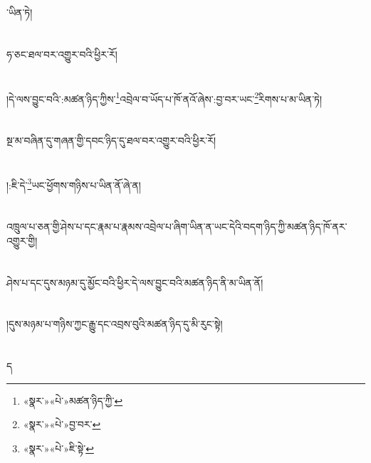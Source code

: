 ་ཡིན་ཏེ།\chapter{ }ཧ་ཅང་ཐལ་བར་འགྱུར་བའི་ཕྱིར་རོ།\chapter{ }།དེ་ལས་བྱུང་བའི་:མཚན་ཉིད་ཀྱིས་\footnote{«སྣར་»«པེ་»མཚན་ཉིད་ཀྱི་}འབྲེལ་བ་ཡོད་པ་ཁོ་ནའོ་ཞེས་:བྱ་བར་ཡང་\footnote{«སྣར་»«པེ་»བྱ་བར་}རིགས་པ་མ་ཡིན་ཏེ།\chapter{ }སྔ་མ་བཞིན་དུ་གཞན་གྱི་དབང་ཉིད་དུ་ཐལ་བར་འགྱུར་བའི་ཕྱིར་རོ།\chapter{ }།:ཇི་དེ་\footnote{«སྣར་»«པེ་»ཇི་སྟེ་}ཡང་ཕྱོགས་གཉིས་པ་ཡིན་ནོ་ཞེ་ན།\chapter{ }འཁྲུལ་པ་ཅན་གྱི་ཤེས་པ་དང་རྣམ་པ་རྣམས་འབྲེལ་པ་ཞིག་ཡིན་ན་ཡང་དེའི་བདག་ཉིད་ཀྱི་མཚན་ཉིད་ཁོ་ནར་འགྱུར་གྱི།\chapter{ }ཤེས་པ་དང་དུས་མཉམ་དུ་མྱོང་བའི་ཕྱིར་དེ་ལས་བྱུང་བའི་མཚན་ཉིད་ནི་མ་ཡིན་ནོ།\chapter{ }།དུས་མཉམ་པ་གཉིས་ཀྱང་རྒྱུ་དང་འབྲས་བུའི་མཚན་ཉིད་དུ་མི་རུང་སྟེ།\chapter{ }ད